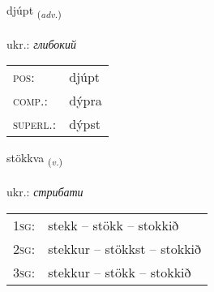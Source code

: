 \documentclass[frontgrid, backgrid]{flacards}\usepackage[]{graphicx}\usepackage[]{xcolor}
\begin{document}
\renewcommand{\flhead}{\vskip5pt \fboxsep=0pt {\small\bfseries\footnotesize Atviksorð | прислівник}}
\renewcommand{\fcfoot}{\vskip5pt \fboxsep=0pt \hspace{2pt}{\small\bfseries\footnotesize 2K}}

\renewcommand{\blhead}{\vskip5pt {\small\bfseries\footnotesize Atviksorð | прислівник }}
\renewcommand{\bcfoot}{\vskip5pt \hspace{2pt}{\small\bfseries\footnotesize 2K}}


{djúpt \small{\textsubscript{(\textit{adv.})}} \\[1ex] %
\textphonetic{[tjuft]} \\
ukr.: \emph{глибокий} \\  [2ex]
\renewcommand*{\arraystretch}{0.8}
\begin{tabular}{ll}
\textsc{pos}: & djúpt \\ 
\textsc{comp.}: & dýpra \\ 
\textsc{superl.}: & dýpst \\
\end{tabular}
}

\renewcommand{\flhead}{\vskip5pt \fboxsep=0pt {\small\bfseries\footnotesize Sagnorð | дієслово}}
\renewcommand{\fcfoot}{\vskip5pt \fboxsep=0pt \hspace{2pt}{\small\bfseries\footnotesize 2K}}

\renewcommand{\blhead}{\vskip5pt {\small\bfseries\footnotesize Sagnorð | дієслово }}
\renewcommand{\bcfoot}{\vskip5pt \hspace{2pt}{\small\bfseries\footnotesize 2K}}


{stökkva \small{\textsubscript{(\textit{v.})}} \\[1ex] %
\textphonetic{[stœhkva]} \\
ukr.: \emph{стрибати} \\  [2ex]
\renewcommand*{\arraystretch}{0.8}
\begin{tabular}{p{1cm}l}
\textsc{1sg}: & stekk -- stökk -- stokkið \\ 
\textsc{2sg}: & stekkur -- stökkst -- stokkið \\ 
\textsc{3sg}: & stekkur -- stökk -- stokkið \\ 
\end{tabular}
}
\end{document}
